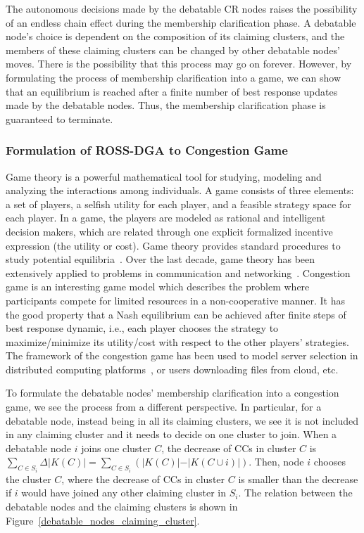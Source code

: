 \documentclass[times]{ettauth}
\newcommand{\ie}{i.e., }
\theoremstyle{mytheoremstyle}
\theoremstyle{mytheoremstyle}
\theoremstyle{mytheoremstyle}
\begin{document}
The autonomous decisions made by the debatable CR nodes raises the possibility of an endless chain effect during the membership clarification phase.
A debatable node's choice is dependent on the composition of its claiming clusters, and the members of these claiming clusters can be changed by other debatable nodes' moves.
There is the possibility that this process may go on forever.
However, by formulating the process of membership clarification into a game, we can show that an equilibrium is reached after a finite number of best response updates made by the debatable nodes.
Thus, the membership clarification phase is guaranteed to terminate.


\subsubsection{Formulation of ROSS-DGA to Congestion Game}
\label{clustering:phaseII:game}
Game theory is a powerful mathematical tool for studying, modeling and analyzing the interactions among individuals.
A game consists of three elements: a set of players, a selfish utility for each player, and a feasible strategy space for each player. 
In a game, the players are modeled as rational and intelligent decision makers, which are related through one explicit formalized incentive expression (the utility or cost).
Game theory provides standard procedures to study potential equilibria~\cite{game_for_communication_01}.
Over the last decade, game theory has been extensively applied to problems in communication and networking~\cite{Neel06analysisand, Wang_gtc_crn_survey_2010}.
Congestion game is an interesting game model which describes the problem where participants compete for limited resources in a non-cooperative manner.
It has the good property that a Nash equilibrium can be achieved after finite steps of best response dynamic, \ie each player chooses the strategy to maximize/minimize its utility/cost with respect to the other players' strategies.
The framework of the congestion game has been used to model server selection in distributed computing platforms~\cite{Cloud_Computing_2010}, or users downloading files from cloud, etc.

To formulate the debatable nodes' membership clarification into a congestion game, we see the process from a different perspective. 
In particular, for a debatable node, instead being in all its claiming clusters, we see it is not included in any claiming cluster and it needs to decide on one cluster to join.
When a debatable node $i$ joins one cluster $C$, the decrease of CCs in cluster $C$ is $\sum_{C\in S_i}\Delta\vert K(C) \vert=\sum_{C\in S_i}({\vert K(C) \vert-\vert K(C\cup i) \vert})$.
Then, node $i$ chooses the cluster $C$, where the decrease of CCs in cluster $C$ is smaller than the decrease if $i$ would have joined any other claiming cluster in $S_i$.
The relation between the debatable nodes and the claiming clusters is shown in Figure~\ref{debatable_nodes_claiming_cluster}.
\end{document}
